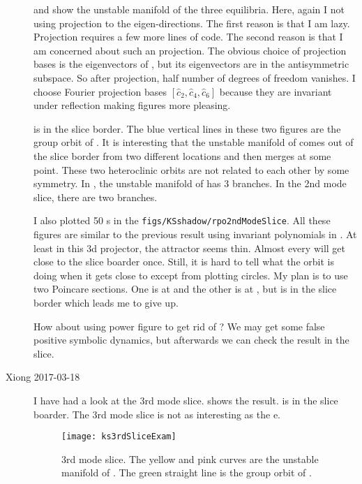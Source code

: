 \begin{description}
 and  show the
unstable manifold of the three equilibria. Here, again I not
using projection to the eigen-directions. The first
reason is that I am lazy. Projection requires a few more lines
of code. The second reason is that I am concerned about such
an projection. The obvious choice of projection bases is the
eigenvectors of , but its eigenvectors are in the
antisymmetric subspace. So after projection, half number of
degrees of freedom vanishes. I choose Fourier projection bases
$[\hat{c}_2, \hat{c}_4, \hat{c}_6]$ because they are invariant
under reflection making figures more pleasing.

 is in the slice border.
The blue vertical lines in these two figures are the group orbit
of . It is interesting that the unstable manifold of 
comes out of the slice border from two different locations and then
merges at some point. These two heteroclinic orbits are not related
to each other by some symmetry. In ,
the unstable manifold of  has 3 branches. In the 2nd mode slice,
there are two branches.

I also plotted 50 \RPO{}s in the \texttt{figs/KSshadow/rpo2ndModeSlice}.
All these figures are similar to the previous result using invariant
polynomials in . At least in this 3d projector, the
attractor seems thin. Almost every \RPO{} will get close to the slice
boarder once. Still, it is hard to tell what the orbit is doing when
it gets close to  except from plotting circles.
My plan is to use two Poincare sections. One is at  and the other
is at , but  is in the slice border which leads me to
give up.

How about using power figure to get rid of ? We may get
some false positive symbolic dynamics, but afterwards we can
check the result in the slice.

\item[Xiong 2017-03-18]
I have had a look at the 3rd mode slice.  shows the
result.  is in the slice boarder. The 3rd mode slice is not as
interesting as the {\sFslice}e.

\begin{figure}[h]
  \centering
  \texttt{[image: ks3rdSliceExam]}
  \caption{
    3rd mode slice. The yellow and pink curves are the unstable manifold
    of . The green straight line is the group orbit of .
  }
  \label{fig:tFslice}
\end{figure}


\end{description}
